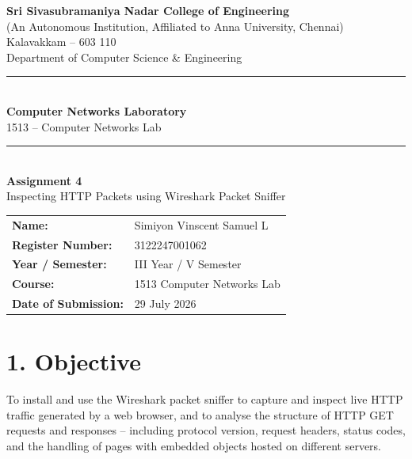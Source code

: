 \documentclass[11pt]{article}
\title{\vspace{-2cm}}
\date{}
\begin{document}
\begin{titlepage}
\centering
\vspace*{1cm}
{\large \textbf{Sri Sivasubramaniya Nadar College of Engineering}}\\
{\small (An Autonomous Institution, Affiliated to Anna University, Chennai)}\\
{\small Kalavakkam -- 603 110}\\[0.3cm]
{\small Department of Computer Science \& Engineering}\\[1.5cm]

\rule{\linewidth}{0.5mm}\\[0.4cm]
{\LARGE \textbf{Computer Networks Laboratory}}\\[0.3cm]
{\Large 1513 -- Computer Networks Lab}\\[0.4cm]
\rule{\linewidth}{0.5mm}\\[1.5cm]

{\huge \textbf{Assignment 4}}\\[0.4cm]
{\Large Inspecting HTTP Packets using Wireshark Packet Sniffer}\\[2cm]

\begin{center}
\begin{tabular}{ll}
\textbf{Name:} & Simiyon Vinscent Samuel L \\[0.2cm]
\textbf{Register Number:} & 3122247001062 \\[0.2cm]
\textbf{Year / Semester:} & III Year / V Semester \\[0.2cm]
\textbf{Course:} & 1513 Computer Networks Lab \\[0.2cm]
\textbf{Date of Submission:} & 29 July 2026 \\[0.2cm]
\end{tabular}
\end{center}

\vfill
\end{titlepage}

\section*{1. Objective}
To install and use the Wireshark packet sniffer to capture and inspect live HTTP traffic
generated by a web browser, and to analyse the structure of HTTP GET requests and responses --
including protocol version, request headers, status codes, and the handling of pages with
embedded objects hosted on different servers.
\end{document}

